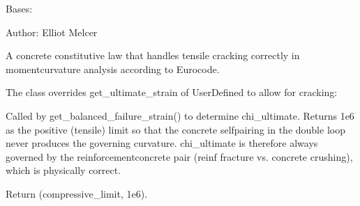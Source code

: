 \documentclass[a4paper,11pt,german]{sphinxmanual}
\begin{document}
\begin{fulllineitems}
\label{\detokenize{api/analysis_core:core.analysis_core.material_methods.CrackingConcreteLawEC}}
\pysigstartsignatures
\pysiglinewithargsret
{}
{\sphinxparamcomma {}\sphinxparamcomma {}\sphinxparamcomma {}\sphinxparamcomma {}}
{}
\pysigstopsignatures
\sphinxAtStartPar
Bases: 

\sphinxAtStartPar
Author: Elliot Melcer

\sphinxAtStartPar
A concrete constitutive law that handles tensile cracking correctly
in moment\sphinxhyphen{}curvature analysis according to Eurocode.

\sphinxAtStartPar
The class overrides get\_ultimate\_strain of UserDefined to allow for cracking:
\begin{description}
\sphinxAtStartPar
Called by get\_balanced\_failure\_strain() to determine chi\_ultimate.
Returns 1e6 as the positive (tensile) limit so that the concrete
self\sphinxhyphen{}pairing in the double loop never produces the governing
curvature.  chi\_ultimate is therefore always governed by the
reinforcement\sphinxhyphen{}concrete pair (reinf fracture vs. concrete crushing),
which is physically correct.

\end{description}

\begin{fulllineitems}
\label{\detokenize{api/analysis_core:core.analysis_core.material_methods.CrackingConcreteLawEC.get_ultimate_strain}}
\pysigstartsignatures
\pysiglinewithargsret
{}
{}
{}
\pysigstopsignatures
\sphinxAtStartPar
Return (compressive\_limit, 1e6).


\end{fulllineitems}
\end{fulllineitems}
\end{document}
